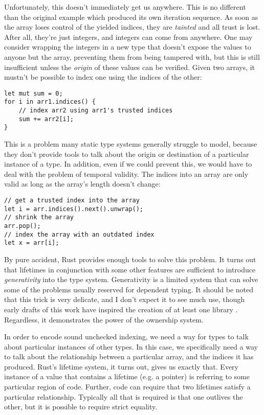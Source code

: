 Unfortunately, this doesn't immediately get us anywhere. This is no different
than the original example which produced its own iteration sequence. As soon
as the array loses control of the yielded indices, they are \emph{tainted} and all
trust is lost. After all, they're just integers, and integers can come from anywhere.
One may consider wrapping the integers in a new type that doesn't
expose the values to anyone but the array, preventing them from being
tampered with, but this is still insufficient unless the \emph{origin} of
these values can be verified. Given two arrays, it mustn't be possible to index
one using the indices of the other:

\begin{verbatim}
let mut sum = 0;
for i in arr1.indices() {
    // index arr2 using arr1's trusted indices
    sum += arr2[i];
}
\end{verbatim}

This is a problem many static type systems generally struggle to model, because
they don't provide tools to talk about the origin or destination of a particular
instance of a type. In addition, even if we could prevent this, we would have to
deal with the problem of temporal validity. The indices into an array are only
valid as long as the array's length doesn't change:

\begin{verbatim}
// get a trusted index into the array
let i = arr.indices().next().unwrap();
// shrink the array
arr.pop();
// index the array with an outdated index
let x = arr[i];
\end{verbatim}

By pure accident, Rust provides enough tools to solve
this problem. It turns out that lifetimes in conjunction with some other features
are sufficient to introduce \emph{generativity} into the type system. Generativity is
a limited system that can solve some of the problems usually reserved for
dependent typing. It should be noted that this trick is very delicate, and I don't expect it
to see much use, though early drafts of this work have inspired the creation
of at least one library \cite{bluss-indexing}. Regardless, it demonstrates the power of
the ownership system.

In order to encode sound unchecked indexing, we need a way for types to talk about
particular instances of other types. In this case, we specifically need a way
to talk about the relationship between a particular array, and the indices it has
produced. Rust's lifetime system, it turns out, gives us exactly that. Every
instance of a value that contains a lifetime (e.g. a pointer) is referring to
some particular region of code. Further, code can require that two lifetimes
satisfy a particular relationship. Typically all that is required is that
one outlives the other, but it is possible to require strict equality.


